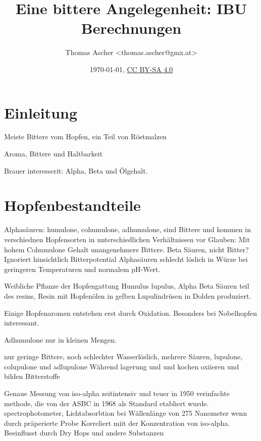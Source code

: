 \documentclass[a4paper,parskip=half]{scrartcl}
\title{Eine bittere Angelegenheit: IBU Berechnungen}
\author{Thomas Ascher <thomas.ascher@gmx.at>}
\date{\today, \href{http://creativecommons.org/licenses/by-sa/4.0/}{CC BY-SA 4.0}}
\begin{document}
\maketitle

\section*{Einleitung}

\parencite{Bastgen2020}

Meiste Bittere vom Hopfen, ein Teil von Röstmalzen \parencite[11]{Garetz1994}

\parencite[10]{Garetz1994}
Aroma, Bittere und Haltbarkeit

\parencite[103]{Garetz1994}
Brauer interesserit: Alpha, Beta und Ölgehalt.


\section*{Hopfenbestandteile}

\parencite[11]{Garetz1994}
Alphasäuren: humulone, cohumulone, adhumulone, sind Bittere und kommen in
verschiednen Hopfensorten in unterschiedlichen Verhältnissen vor
Glauben: Mit hohem Cohumulone Gehalt unangenehmere Bittere.
Beta Säuren, nicht Bitter? Ignoriert hinsichtlich Bitterpotential
Alphasäuren schlecht löslich in Würze bei geringeren Temperaturen
und normalem pH-Wert.

\parencite[20]{Garetz1994}
Weibliche Pflanze der Hopfengattung Humulus lupulus, Alpha Beta
Säuren teil des resins, Resin mit Hopfenölen in gelben
Lupulindrüsen in Dolden produziert.

\parencite[100]{Garetz1994} Einige Hopfenaromen entstehen erst
durch Oxidation. Besonders bei Nobelhopfen interessant.

\parencite[119]{Garetz1994} 
Adhumulone nur in kleinen Mengen.

\parencite[120]{Garetz1994} 
nur geringe Bittere, noch schlechter Wasserlöslich, mehrere Säuren,
lupulone, colupulone und adlupulone
Während lagerung und und kochen oxiieren und bilden Bitterstoffe

\parencite[60]{Beechum2017}
Genaue Messung von iso-alpha zeitintensiv und teuer
in 1950 verinfachte methode, die von der ASBC in 1968
als Standard etabliert wurde.
spectrophotometer, Lichtabsorbtion bei Wällenlänge
von 275 Nanometer wenn durch präperierte Probe
Korreliert miit der Konzentration von iso-alpha.
Beeinflusst durch Dry Hops und andere Substanzen
\end{document}
